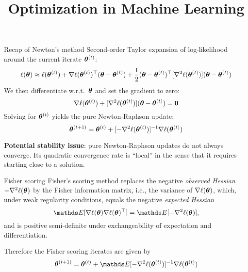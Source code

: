 \documentclass[11pt,compress,t,notes=noshow, xcolor=table]{beamer}
\title{Optimization in Machine Learning}
\begin{document}

\begin{vbframe}{Recap of Newton's method}
Second-order Taylor expansion of log-likelihood around the current iterate $\bm{\theta}^{(t)}$:
$$\ell(\bm{\theta}) \approx \ell(\bm{\theta}^{(t)}) +
\nabla\ell(\bm{\theta}^{(t)})^\top(\bm{\theta}-\bm{\theta}^{(t)}) + 
\frac{1}{2}(\bm{\theta}-\bm{\theta}^{(t)})^\top[\nabla^{2}\ell(\bm{\theta}^{(t)})](\bm{\theta}-\bm{\theta}^{(t)})$$
We then differentiate w.r.t.~$\bm{\theta}$ and set the gradient to zero:
$$\nabla\ell(\bm{\theta}^{(t)}) + [\nabla^{2}\ell(\bm{\theta}^{(t)})](\bm{\theta}-\bm{\theta}^{(t)}) = \mathbf{0}$$
Solving for $\bm{\theta}^{(t)}$ yields the pure Newton-Raphson update:
$$\bm{\theta}^{(t+1)}=\bm{\theta}^{(t)} + [-\nabla^{2}\ell(\bm{\theta}^{(t)})]^{-1}\nabla\ell(\bm{\theta}^{(t)})$$

\lz

\textbf{Potential stability issue}: pure Newton-Raphson updates do not always converge. Its quadratic convergence rate is ``local'' in the sense that it requires starting close to a solution.  %
\end{vbframe}

\begin{vbframe}{Fisher scoring}
Fisher’s scoring method replaces the negative \textit{observed Hessian} $-\nabla^{2}\ell(\bm{\theta})$ 
by the Fisher information matrix, i.e., the variance of $\nabla \ell(\bm{\theta})$, which, under weak regularity conditions, equals the negative \textit{expected Hessian}
$$\E[\nabla\loglt\nabla\loglt^\top]=\E[-\nabla^{2}\loglt],$$
and is positive semi-definite under exchangeability of expectation and differentiation.\\

\lz

Therefore the Fisher scoring iterates are given by
$$\thetav^{(t+1)}=\thetav^{(t)}+\E[-\nabla^{2}\logl(\thetav^{(t)})]^{-1}\nabla\logl(\thetav^{(t)})$$
\end{vbframe}
\end{document}
